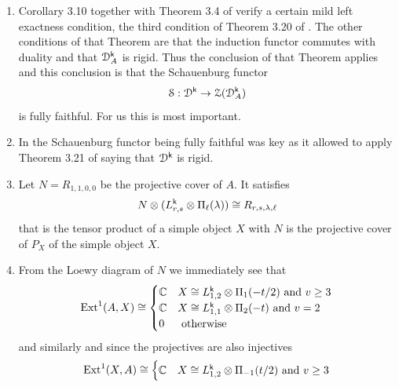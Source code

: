 \documentclass[a4paper, reqno]{amsart}
\theoremstyle{introTheorems}
\newcommand\cD{\mathcal{D}}
\newcommand\cS{\mathcal{S}}
\newcommand\cZ{\mathcal{Z}}
\newcommand{\Ext}{\textup{Ext}}
\renewcommand{\1}{\mathbbold{1}}
\begin{document}
\begin{enumerate}
The case $v=2$ is similar but much simpler, see section 4.2 of  \cite{CMY1}, i.e. the Loewy diagram of the projectives  is 
\begin{center}
\end{center}
\item Corollary 3.10 together with Theorem 3.4 of  \cite{CMY1} verify a certain mild left exactness condition, the third condition of Theorem 3.20 of \cite{CMSY24}. The other conditions of that Theorem are that the induction functor commutes with duality and that $\cD^\k_A$ is rigid. Thus the conclusion of that Theorem applies and this conclusion is that the Schauenburg functor
\[
\cS: \cD^\k \rightarrow \cZ(\cD^\k_A)
\]
is fully faithful. For us this is most important.
\item In \cite{CMY1} the Schauenburg functor being fully faithful was key as it allowed to apply Theorem 3.21 of \cite{CMSY24} saying that $\cD^\k$ is rigid. 
\item Let $N = R_{1, 1, 0, 0}$ be the projective cover of $A$. It satisfies 
\[
N \otimes (L^{\mathsf{k}}_{r, s} \otimes \Pi_\ell(\lambda))  \cong R_{r, s, \lambda, \ell}
\]
that is the tensor product of a simple object $X$ with $N$ is the projective cover of $P_X$ of the simple object $X$.
\item From the Loewy diagram of $N$ we immediately see that 
\[
\Ext^1(A, X) \cong \begin{cases} \mathbb C & X \cong \VirPhi_{1,2} \otimes \Pi_1(-t/2) \ \text{and} \ v \geq 3 \\
\mathbb C & X \cong \VirPhi_{1,1} \otimes \Pi_2(-t) \ \text{and} \ v = 2 \\ 
0 & \ \text{otherwise} 
\end{cases}
\]
and similarly and since the projectives are also injectives
\[
\Ext^1(X, A) \cong \begin{cases} \mathbb C & X \cong \VirPhi_{1,2} \otimes \Pi_{-1}(t/2) \ \text{and} \ v \geq 3 \\

\end{cases}\]
\end{enumerate}
\end{document}
